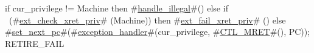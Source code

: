 if   cur_privilege != Machine
then #\hyperref[sailRISCVzhandlezyillegal]{handle\_illegal}#()
else if ~(#\hyperref[sailRISCVzextzycheckzyxretzypriv]{ext\_check\_xret\_priv}# (Machine))
then #\hyperref[sailRISCVzextzyfailzyxretzypriv]{ext\_fail\_xret\_priv}# ()
else #\hyperref[sailRISCVzsetzynextzypc]{set\_next\_pc}#(#\hyperref[sailRISCVzexceptionzyhandler]{exception\_handler}#(cur_privilege, #\hyperref[sailRISCVzCTLzyMRET]{CTL\_MRET}#(), PC));
RETIRE_FAIL
